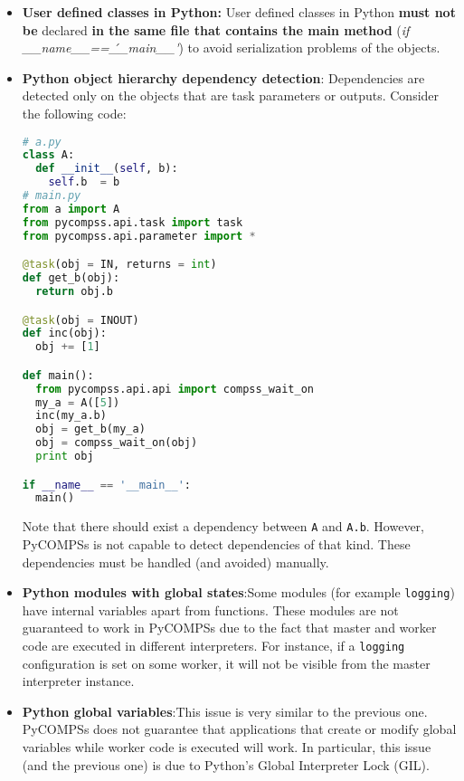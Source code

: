 \begin{itemize}
 \item \textbf{User defined classes in Python:} \newline User defined classes in Python \textbf{must not be} declared \textbf{in the same file
 that contains the main method} (\emph{if \_\_name\_\_==\'\_\_main\_\_\'}) to avoid serialization problems of the objects.
 
 \item \textbf{Python object hierarchy dependency detection}: \newline Dependencies are detected only on the objects that are task 
 parameters or outputs. Consider the following code:
\begin{lstlisting}[language=python]
# a.py
class A:
  def __init__(self, b):
    self.b  = b
# main.py
from a import A
from pycompss.api.task import task
from pycompss.api.parameter import *

@task(obj = IN, returns = int)
def get_b(obj):
  return obj.b

@task(obj = INOUT)
def inc(obj):
  obj += [1]

def main():
  from pycompss.api.api import compss_wait_on
  my_a = A([5])
  inc(my_a.b)
  obj = get_b(my_a)
  obj = compss_wait_on(obj)
  print obj

if __name__ == '__main__':
  main()            
\end{lstlisting}
 Note that there should exist a dependency between \verb|A| and \verb|A.b|. However, PyCOMPSs is not capable
 to detect dependencies of that kind. These dependencies
 must be handled (and avoided) manually.

 \item \textbf{Python modules with global states}:\newline Some modules (for example \verb|logging|) have internal variables apart from functions. 
 These modules are not guaranteed to work in PyCOMPSs due to the fact that master and worker code are executed in different interpreters. For instance, if a \verb|logging| configuration is set on some
 worker, it will not be visible from the master interpreter instance.

 \item \textbf{Python global variables}:\newline This issue is very similar to the previous one.
 PyCOMPSs does not guarantee that applications that create or modify global variables while 
 worker code is executed will work. In particular, this issue (and the previous one) is due to Python's Global Interpreter Lock (GIL).


\end{itemize}
